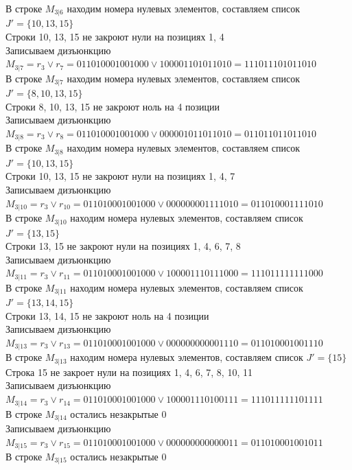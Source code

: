 \documentclass[12pt,a4paper]{report}
\begin{document}
В строке $M_{3 | 6}$ находим номера нулевых элементов, составляем список $J' = \{10, 13, 15\}$ \\
Строки 10, 13, 15 не закроют нули на позициях 1, 4 \\
Записываем дизъюнкцию $M_{3 | 7} = r_{3}\vee r_{7} = 011010001001000 \vee 100001101011010 = 111011101011010$ \\
В строке $M_{3 | 7}$ находим номера нулевых элементов, составляем список $J' = \{8, 10, 13, 15\}$ \\
Строки 8, 10, 13, 15 не закроют ноль на 4 позиции \\
Записываем дизъюнкцию $M_{3 | 8} = r_{3}\vee r_{8} = 011010001001000 \vee 000001011011010 = 011011011011010$ \\
В строке $M_{3 | 8}$ находим номера нулевых элементов, составляем список $J' = \{10, 13, 15\}$ \\
Строки 10, 13, 15 не закроют нули на позициях 1, 4, 7 \\
Записываем дизъюнкцию $M_{3 | 10} = r_{3}\vee r_{10} = 011010001001000 \vee 000000001111010 = 011010001111010$ \\
В строке $M_{3 | 10}$ находим номера нулевых элементов, составляем список $J' = \{13, 15\}$ \\
Строки 13, 15 не закроют нули на позициях 1, 4, 6, 7, 8 \\
Записываем дизъюнкцию $M_{3 | 11} = r_{3}\vee r_{11} = 011010001001000 \vee 100001110111000 = 111011111111000$ \\
В строке $M_{3 | 11}$ находим номера нулевых элементов, составляем список $J' = \{13, 14, 15\}$ \\
Строки 13, 14, 15 не закроют ноль на 4 позиции \\
Записываем дизъюнкцию $M_{3 | 13} = r_{3}\vee r_{13} = 011010001001000 \vee 000000000001110 = 011010001001110$ \\
В строке $M_{3 | 13}$ находим номера нулевых элементов, составляем список $J' = \{15\}$ \\
Строка 15 не закроет нули на позициях 1, 4, 6, 7, 8, 10, 11 \\
Записываем дизъюнкцию $M_{3 | 14} = r_{3}\vee r_{14} = 011010001001000 \vee 100001110100111 = 111011111101111$ \\
В строке $M_{3 | 14}$ остались незакрытые $0$ \\
Записываем дизъюнкцию $M_{3 | 15} = r_{3}\vee r_{15} = 011010001001000 \vee 000000000000011 = 011010001001011$ \\
В строке $M_{3 | 15}$ остались незакрытые $0$ \\
\end{document}

